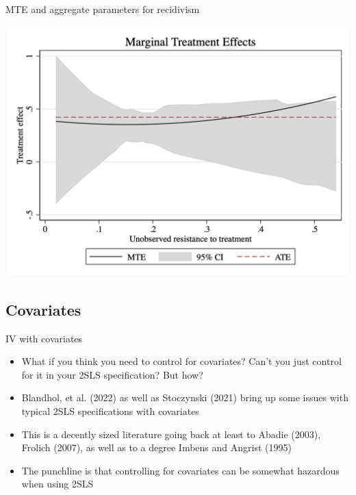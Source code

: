 \documentclass{beamer}
\begin{document}
\begin{frame}{MTE and aggregate parameters for recidivism}

    \includegraphics[width=\textwidth]{./lecture_includes/mte_recid__2.png}

\end{frame}
\subsection{Covariates}

\begin{frame}{IV with covariates}

\begin{itemize}
\item What if you think you need to control for covariates?  Can't you just control for it in your 2SLS specification? But how?
\item Blandhol, et al. (2022) as well as Stoczynski (2021) bring up some issues with typical 2SLS specifications with covariates
\item This is a decently sized literature going back at least to Abadie (2003), Frolich (2007), as well as to a degree Imbens and Angrist (1995)
\item The punchline is that controlling for covariates can be somewhat hazardous when using 2SLS
\end{itemize}


\end{frame}
\end{document}
